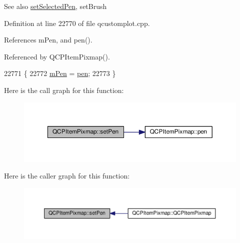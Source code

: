\begin{DoxySeeAlso}{See also}
\hyperlink{class_q_c_p_item_pixmap_afc5e479e88e53740176ce77cb70dd67a}{set\+Selected\+Pen}, set\+Brush 
\end{DoxySeeAlso}


Definition at line 22770 of file qcustomplot.\+cpp.



References m\+Pen, and pen().



Referenced by Q\+C\+P\+Item\+Pixmap().


\begin{DoxyCode}
22771 \{
22772   \hyperlink{class_q_c_p_item_pixmap_acfee1124eb51a1887aaf8de10777c7a1}{mPen} = \hyperlink{class_q_c_p_item_pixmap_ab2b821c80cfade589472e933b9c4361f}{pen};
22773 \}
\end{DoxyCode}


Here is the call graph for this function\+:\nopagebreak
\begin{figure}[H]
\begin{center}
\leavevmode
\includegraphics[width=350pt]{class_q_c_p_item_pixmap_acdade1305edb4b5cae14f97fd132065f_cgraph}
\end{center}
\end{figure}




Here is the caller graph for this function\+:\nopagebreak
\begin{figure}[H]
\begin{center}
\leavevmode
\includegraphics[width=350pt]{class_q_c_p_item_pixmap_acdade1305edb4b5cae14f97fd132065f_icgraph}
\end{center}
\end{figure}


\hypertarget{class_q_c_p_item_pixmap_a726b69ea4025edf48f9b29b6450548a7}{}
